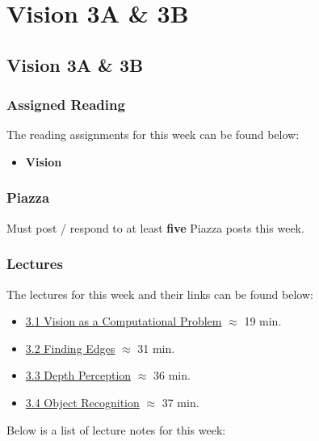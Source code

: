 \clearpage

\renewcommand{\ChapTitle}{Vision 3A \& 3B}
\renewcommand{\SectionTitle}{Vision 3A \& 3B}

\chapter{\ChapTitle}
\section{\SectionTitle}

\subsection{Assigned Reading}

The reading assignments for this week can be found below:

\begin{itemize}
    \item \textbf{Vision}
\end{itemize}

\subsection{Piazza}

Must post / respond to at least \textbf{five} Piazza posts this week.

\subsection{Lectures}

The lectures for this week and their links can be found below:

\begin{itemize}
    \item \href{https://www.youtube.com/watch?v=c8yacaB0TEs}{3.1 Vision as a Computational Problem} $\approx$ 19 min.
    \item \href{https://www.youtube.com/watch?v=4-LCyFr6hRQ}{3.2 Finding Edges} $\approx$ 31 min.
    \item \href{https://www.youtube.com/watch?v=_psVot3Y8Lo}{3.3 Depth Perception} $\approx$ 36 min.
    \item \href{https://www.youtube.com/watch?v=OBm_lyWIm9Q}{3.4 Object Recognition} $\approx$ 37 min.
\end{itemize}

\noindent Below is a list of lecture notes for this week:

